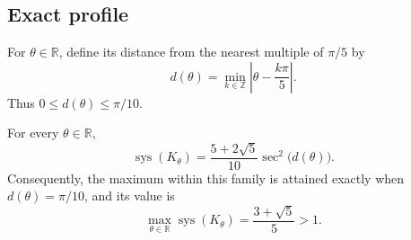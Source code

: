 \subsection{Exact profile}
\label{subsec:rotated-regular-polygons-formula-for-the-pentagon-product}

For \(\theta\in\mathbb R\), define its distance from the nearest multiple of
\(\pi/5\) by
\[
  d(\theta)=\min_{k\in\mathbb Z}
    \left|\theta-\frac{k\pi}{5}\right|.
\]
Thus \(0\le d(\theta)\le\pi/10\).

\begin{theorem}
\label{thm:rotated-pentagon-product-formula}
For every \(\theta\in\mathbb R\),
\[
  \operatorname{sys}(K_\theta)
  =
  \frac{5+2\sqrt5}{10}\sec^2\!\bigl(d(\theta)\bigr).
\]
Consequently, the maximum within this family is attained exactly when
\(d(\theta)=\pi/10\), and its value is
\[
  \max_{\theta\in\mathbb R}\operatorname{sys}(K_\theta)
  =\frac{3+\sqrt5}{5}>1.
\]
\end{theorem}

